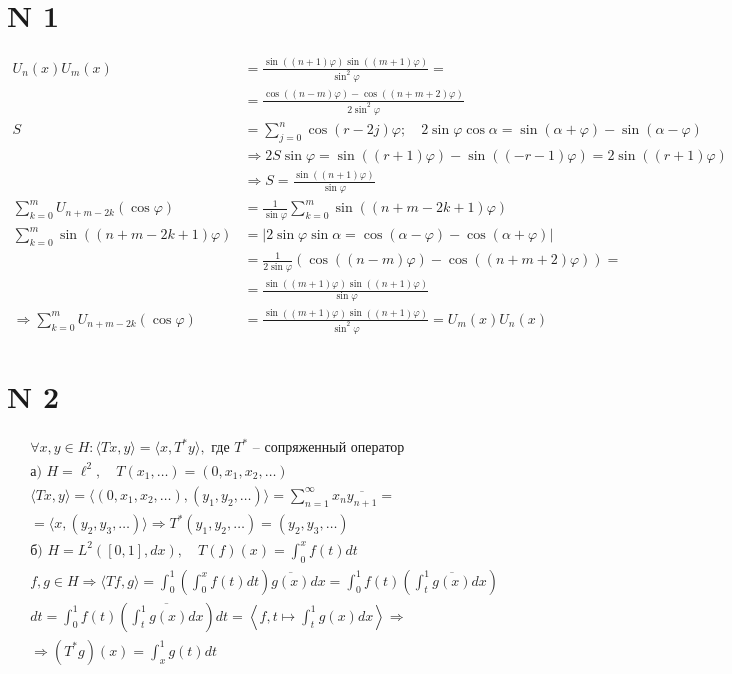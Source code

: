 \documentclass[12pt]{article}
\begin{document}
\section*{N 1}

\begin{align*}
U_n(x) U_m(x) &= \frac{\sin((n+1)\varphi) \sin((m+1)\varphi)}{\sin^2 \varphi} = \\
&= \frac{\cos((n-m)\varphi) - \cos((n+m+2)\varphi)}{2\sin^2 \varphi} \\
S &= \sum_{j=0}^{n} \cos(r-2j)\varphi ; \quad 2\sin\varphi \cos\alpha = \sin(\alpha+\varphi) - \sin(\alpha-\varphi) \\
&\Rightarrow 2S\sin\varphi = \sin((r+1)\varphi) - \sin((-r-1)\varphi) = 2\sin((r+1)\varphi) \\
&\Rightarrow S = \frac{\sin((n+1)\varphi)}{\sin\varphi} \\
\sum_{k=0}^{m} U_{n+m-2k}(\cos\varphi) &= \frac{1}{\sin\varphi} \sum_{k=0}^{m} \sin((n+m-2k+1)\varphi) \\
\sum_{k=0}^{m} \sin((n+m-2k+1)\varphi) &= \left| 2\sin\varphi\sin\alpha = \cos(\alpha-\varphi) - \cos(\alpha+\varphi) \right| \\
&= \frac{1}{2\sin\varphi} (\cos((n-m)\varphi) - \cos((n+m+2)\varphi)) = \\
&= \frac{\sin((m+1)\varphi)\sin((n+1)\varphi)}{\sin\varphi} \\
\Rightarrow \sum_{k=0}^{m} U_{n+m-2k}(\cos\varphi) &= \frac{\sin((m+1)\varphi)\sin((n+1)\varphi)}{\sin^2\varphi} = U_m(x)U_n(x)
\end{align*}

\vspace{1cm}

\section*{N 2}

\begin{align*}
&\forall x, y \in H : \langle T x, y \rangle = \langle x, T^* y \rangle, \text{ где } T^* \text{ -- сопряженный оператор} \\
&\text{а) } H = \ell^2, \quad T(x_1, \dots) = (0, x_1, x_2, \dots) \\
&\langle T x, y \rangle = \langle (0, x_1, x_2, \dots), (y_1, y_2, \dots) \rangle = \sum_{n=1}^{\infty} x_n \overline{y_{n+1}} = \\
&= \langle x, (y_2, y_3, \dots) \rangle \Rightarrow T^* (y_1, y_2, \dots) = (y_2, y_3, \dots) \\
&\text{б) } H = L^2([0, 1], dx), \quad T(f)(x) = \int_{0}^{x} f(t) dt \\
&f, g \in H \Rightarrow \langle T f, g \rangle = \int_{0}^{1} \left( \int_{0}^{x} f(t) dt \right) \overline{g(x)} dx = \int_{0}^{1} f(t) \left( \int_{t}^{1} \overline{g(x)} dx \right) \\
&dt = \int_{0}^{1} f(t) \left( \overline{\int_{t}^{1} g(x) dx} \right) dt = \left\langle f, t \mapsto \int_{t}^{1} g(x) dx \right\rangle \Rightarrow \\
&\Rightarrow (T^* g)(x) = \int_{x}^{1} g(t) dt
\end{align*}
\end{document}
